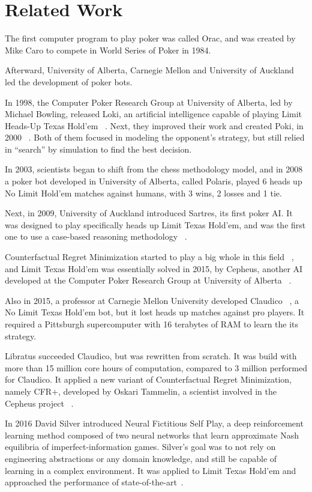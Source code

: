 \section{Related Work}
\label{chap:related-work}

The first computer program to play poker was called Orac, and was created by Mike Caro to compete in World Series of Poker in 1984.

Afterward, University of Alberta, Carnegie Mellon and University of Auckland led the development of poker bots.

In 1998, the Computer Poker Research Group at University of Alberta, led by Michael Bowling, released Loki, an artificial intelligence capable of playing Limit Heads-Up Texas Hold’em ~\cite{Billings2016}. Next, they improved their work and created Poki, in 2000 ~\cite{Davidson2000}. Both of them focused in modeling the opponent’s strategy, but still relied in “search” by simulation to find the best decision.

In 2003, scientists began to shift from the chess methodology model, and in 2008 a poker bot developed in University of Alberta, called Polaris, played 6 heads up No Limit Hold’em matches against humans, with 3 wins, 2 losses and 1 tie.

Next, in 2009, University of Auckland introduced Sartres, its first poker AI. It was designed to play specifically heads up Limit Texas Hold’em, and was the first one to use a case-based reasoning methodology ~\cite{Rubin2009}.

Counterfactual Regret Minimization started to play a big whole in this field ~\cite{Zikenvich2008}, and Limit Texas Hold’em was essentially solved in 2015, by Cepheus, another AI developed at the Computer Poker Research Group at University of Alberta ~\cite{Bowling2008}.

Also in 2015, a professor at Carnegie Mellon University developed Claudico ~\cite{Brown2015}, a No Limit Texas Hold’em bot, but it lost heads up matches against pro players. It required  a Pittsburgh supercomputer with 16 terabytes of RAM to learn the its strategy.

Libratus succeeded Claudico, but was rewritten from scratch. It was build with more than 15 million core hours of computation, compared to 3 million performed for Claudico. It applied a new variant of Counterfactual Regret Minimization, namely CFR+, developed by Oskari Tammelin, a scientist involved in the Cepheus project ~\cite{Brown2017}.

In 2016 David Silver introduced Neural Fictitious Self Play, a deep reinforcement learning method composed of two neural networks that learn approximate Nash equilibria of imperfect-information games. Silver's goal was to not rely on engineering abstractions or any domain knowledge, and still be capable of learning in a complex environment. It was applied to Limit Texas Hold'em and approached the performance of state-of-the-art~\cite{Silver2016}.

